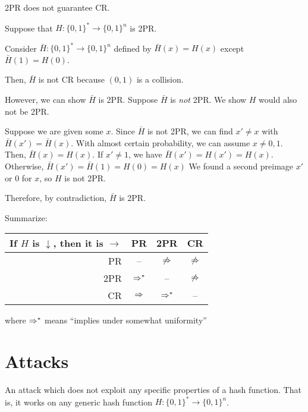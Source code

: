\documentclass[class=co487,tikz,notes]{agony}
\begin{document}
\begin{prop}
  2PR does not guarantee CR.
\end{prop}
\begin{prf}
  Suppose that $H : \{0,1\}^* \to \{0,1\}^n$ is 2PR.

  Consider $\bar H : \{0,1\}^* \to \{0,1\}^n$ defined by $\bar H(x) = H(x)$
  except $\bar H(1) = H(0)$.

  Then, $\bar H$ is not CR because $(0,1)$ is a collision.

  However, we can show $\bar H$ is 2PR. Suppose $\bar H$ is \emph{not} 2PR.
  We show $H$ would also not be 2PR.

  Suppose we are given some $x$.
  Since $\bar H$ is not 2PR, we can find $x' \neq x$ with $\bar H(x') = \bar H(x)$.
  With almost certain probability, we can assume $x \neq 0,1$.
  Then, $\bar H(x) = H(x)$.
  If $x' \neq 1$, we have $\bar H(x') = H(x') = H(x)$.
  Otherwise, $\bar H(x') = \bar H(1) = H(0) = H(x)$
  We found a second preimage $x'$ or 0 for $x$, so $H$ is not 2PR.

  Therefore, by contradiction, $\bar H$ is 2PR.
\end{prf}

\begin{theorem}
  Summarize:
  \begin{center}
    \begin{tabular}{r|ccc}
      If $H$ is $\downarrow$, then it is $\rightarrow$ & PR        & 2PR         & CR          \\ \hline
      PR                                               & --        & $\not\Rightarrow$ & $\not\Rightarrow$ \\
      2PR                                              & $\Rightarrow^*$ & --          & $\not\Rightarrow$ \\
      CR                                               & $\Rightarrow$   & $\Rightarrow^*$   & --
    \end{tabular}
  \end{center}
  where $\Rightarrow^*$ means ``implies under somewhat uniformity''
\end{theorem}

\section{Attacks}

\begin{defn}
  An attack which does not exploit any specific properties of a hash function.
  That is, it works on any generic hash function $H : \{0,1\}^* \to \{0,1\}^n$.
\end{defn}
\end{document}
